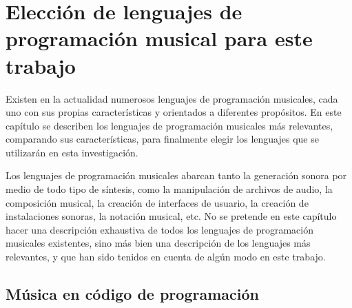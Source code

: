 \chapter{Elección de lenguajes de programación musical para este trabajo}


Existen en la actualidad numerosos lenguajes de programación musicales, cada uno con sus propias características y orientados a diferentes propósitos. En este capítulo se describen los lenguajes de programación musicales más relevantes, comparando sus características, para finalmente elegir los lenguajes que se utilizarán en esta investigación.

Los lenguajes de programación musicales abarcan tanto la generación sonora por medio de todo tipo de síntesis, como la manipulación de archivos de audio, la composición musical, la creación de interfaces de usuario, la creación de instalaciones sonoras, la notación musical, etc. No se pretende en este capítulo hacer una descripción exhaustiva de todos los lenguajes de programación musicales existentes, sino más bien una descripción de los lenguajes más relevantes, y que han sido tenidos en cuenta de algún modo en este trabajo. 

\section{Música en código de programación}

